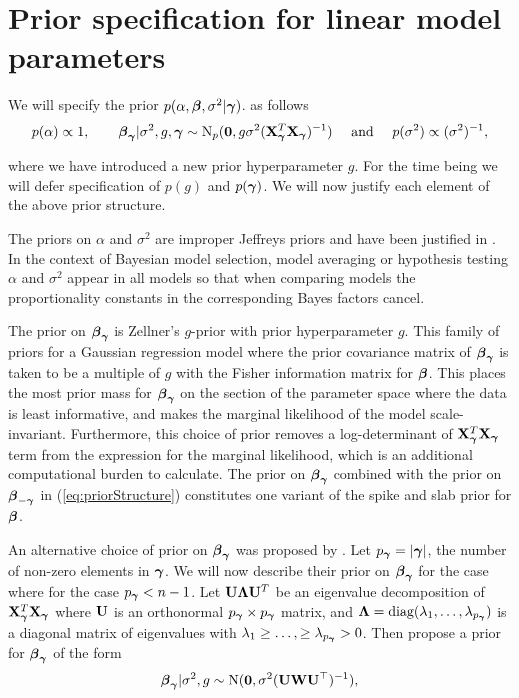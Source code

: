 \section{Prior specification for linear model parameters}
\label{sec:model}

We will specify the prior $p(\alpha,{\boldsymbol \beta},\sigma^2|{\boldsymbol \gamma})$.
as follows
\begin{equation}
	\label{eq:priorStructure}
	\begin{array}{c}
		\displaystyle p(\alpha) \propto 1,  
		\qquad 
		{\boldsymbol\beta}_{\boldsymbol \gamma} | \sigma^2, g, {\boldsymbol \gamma} \sim \text{N}_p({\bf 0}, g \sigma^2 ({\bf X}_{\boldsymbol \gamma}^T {\bf X}_{\boldsymbol \gamma})^{-1})
		\quad \text{ and }  \quad 
		\displaystyle p(\sigma^2) \propto (\sigma^2)^{-1},                      
	\end{array}
\end{equation} 

\noindent where we have introduced a new prior hyperparameter $g$.
For the time being we will defer specification of $p(g)$ and $p({\boldsymbol \gamma})$.
We will now justify each element of the above prior structure.

The priors on $\alpha$ and $\sigma^2$ are improper Jeffreys priors and have been justified 
in \cite{Berger1998}. In the context of Bayesian model selection, model averaging or hypothesis 
testing $\alpha$ and $\sigma^2$ appear in all models 
so that when comparing models the proportionality constants in the corresponding
Bayes factors cancel.

The prior on ${\boldsymbol \beta}_{\boldsymbol \gamma}$ is Zellner's $g$-prior \citep[see for example,][]{Zellner1986} with prior 
hyperparameter $g$. This family of priors for a Gaussian regression model where the prior covariance 
matrix of ${\boldsymbol \beta}_{\boldsymbol \gamma}$ is taken to be a multiple of $g$ with the Fisher information matrix for ${\boldsymbol \beta}$. 
This places the most prior mass for ${\boldsymbol \beta}_{\boldsymbol \gamma}$ on the section of the parameter space where the data is 
least informative, and makes the marginal likelihood of the model scale-invariant. Furthermore, this 
choice of prior removes a log-determinant of ${\bf X}_{\boldsymbol \gamma}^T{\bf X}_{\boldsymbol \gamma}$ term from the expression for the marginal 
likelihood, which is an additional computational burden to calculate.
The prior on ${\boldsymbol \beta}_{\boldsymbol \gamma}$ combined with the prior on ${\boldsymbol \beta}_{-{\boldsymbol \gamma}}$
in (\ref{eq:priorStructure}) constitutes one variant of the spike and slab prior for ${\boldsymbol \beta}$.

An alternative choice of prior on ${\boldsymbol \beta}_{\boldsymbol \gamma}$ was proposed by \cite{Maruyama2011}. Let
$p_{{\boldsymbol \gamma}} = |{\boldsymbol \gamma}|$, the number of non-zero elements in ${\boldsymbol \gamma}$. We will now describe their prior on ${\boldsymbol \beta}_{\boldsymbol \gamma}$ for the case where for the case
$p_{{\boldsymbol \gamma}} < n - 1$. Let ${\bf U}{\boldsymbol \Lambda}{\bf U}^T$ be an eigenvalue decomposition of ${\bf X}_{\boldsymbol \gamma}^T{\bf X}_{\boldsymbol \gamma}$
where ${\bf U}$ is an orthonormal $p_{{\boldsymbol \gamma}} \times p_{{\boldsymbol \gamma}}$ matrix, and ${\boldsymbol \Lambda} = \mbox{diag}(\lambda_1,\ldots,\lambda_{p_{{\boldsymbol \gamma}}})$ 
is a diagonal matrix of eigenvalues with $\lambda_1\ge\ldots,\ge \lambda_{p_{{\boldsymbol \gamma}}}>0$. Then \cite{Maruyama2011} 
propose a prior for ${\boldsymbol \beta}_{\boldsymbol \gamma}$ of the form
\begin{equation}
	\label{eq:priorBetaMG}
	{\boldsymbol\beta}_{\boldsymbol \gamma} | \sigma^2, g \sim \text{N}({\bf 0}, \sigma^2 ({\bf U}{\bf W}{\bf U}^\top)^{-1}),   
\end{equation} 

